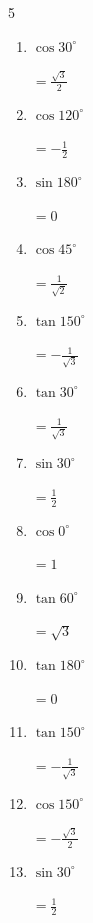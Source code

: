 \begin{multicols}{5}
\begin{enumerate}
\columnbreak %

  \item $\displaystyle \cos{30^\circ}$

        $\displaystyle =\frac{\sqrt{3}}{2}$

  \item $\displaystyle \cos{120^\circ}$

        $\displaystyle =-\frac{1}{2}$

  \item $\displaystyle \sin{180^\circ}$

        $\displaystyle =0$

  \item $\displaystyle \cos{45^\circ}$

        $\displaystyle =\frac{1}{\sqrt{2}}$

  \item $\displaystyle \tan{150^\circ}$

        $\displaystyle =-\frac{1}{\sqrt{3}}$

  \item $\displaystyle \tan{30^\circ}$

        $\displaystyle =\frac{1}{\sqrt{3}}$

  \item $\displaystyle \sin{30^\circ}$

        $\displaystyle =\frac{1}{2}$

  \item $\displaystyle \cos{0^\circ}$

        $\displaystyle =1$

  \item $\displaystyle \tan{60^\circ}$

        $\displaystyle =\sqrt{3}$

  \item $\displaystyle \tan{180^\circ}$

        $\displaystyle =0$

  \item $\displaystyle \tan{150^\circ}$

        $\displaystyle =-\frac{1}{\sqrt{3}}$

  \item $\displaystyle \cos{150^\circ}$

        $\displaystyle =-\frac{\sqrt{3}}{2}$

  \item $\displaystyle \sin{30^\circ}$

        $\displaystyle =\frac{1}{2}$


\end{enumerate}
\end{multicols}
